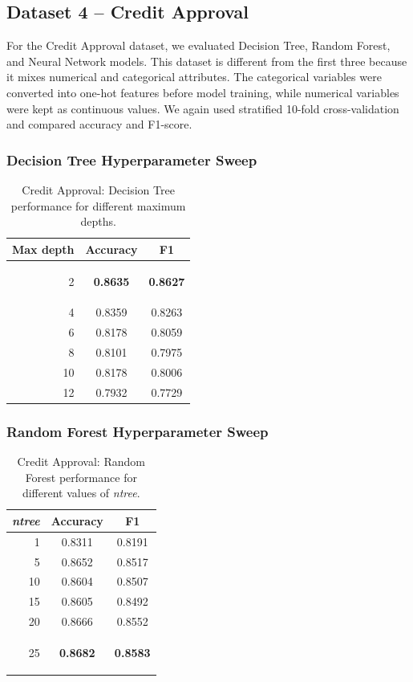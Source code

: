 \documentclass[11pt]{article}
\newcommand{\best}[1]{\colorbox{bestgray}{\strut\textbf{#1}}}
\begin{document}
\subsection{Dataset 4 -- Credit Approval}

For the Credit Approval dataset, we evaluated Decision Tree, Random Forest, and Neural
Network models. This dataset is different from the first three because it mixes numerical
and categorical attributes. The categorical variables were converted into one-hot features
before model training, while numerical variables were kept as continuous values. We again
used stratified 10-fold cross-validation and compared accuracy and F1-score.

\subsubsection*{Decision Tree Hyperparameter Sweep}

\begin{table}[H]
\centering
\caption{Credit Approval: Decision Tree performance for different maximum depths.}
\begin{tabular}{rcc}
\toprule
Max depth & Accuracy & F1 \\
\midrule
2  & \best{0.8635} & \best{0.8627} \\
4  & 0.8359 & 0.8263 \\
6  & 0.8178 & 0.8059 \\
8  & 0.8101 & 0.7975 \\
10 & 0.8178 & 0.8006 \\
12 & 0.7932 & 0.7729 \\
\bottomrule
\end{tabular}
\end{table}

\subsubsection*{Random Forest Hyperparameter Sweep}

\begin{table}[H]
\centering
\caption{Credit Approval: Random Forest performance for different values of \textit{ntree}.}
\begin{tabular}{rcc}
\toprule
\textit{ntree} & Accuracy & F1 \\
\midrule
1  & 0.8311 & 0.8191 \\
5  & 0.8652 & 0.8517 \\
10 & 0.8604 & 0.8507 \\
15 & 0.8605 & 0.8492 \\
20 & 0.8666 & 0.8552 \\
25 & \best{0.8682} & \best{0.8583} \\
\bottomrule
\end{tabular}
\end{table}
\end{document}
